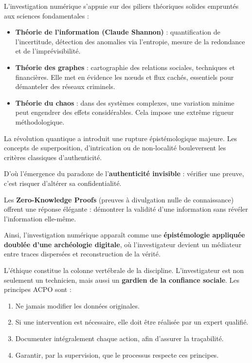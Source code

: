 \documentclass[12pt,a4paper]{report}
\begin{document}
{\noindent
L’investigation numérique s’appuie sur des piliers théoriques solides empruntés aux sciences fondamentales :  

\begin{itemize}
    \item \textbf{Théorie de l’information (Claude Shannon)} : quantification de l’incertitude, détection des anomalies via l’entropie, mesure de la redondance et de l’imprévisibilité.  

    \item \textbf{Théorie des graphes} : cartographie des relations sociales, techniques et financières. 
    Elle met en évidence les nœuds et flux cachés, essentiels pour démanteler des réseaux criminels.  

    \item \textbf{Théorie du chaos} : dans des systèmes complexes, une variation minime peut engendrer des effets considérables. 
    Cela impose une extrême rigueur méthodologique.  
\end{itemize}

La révolution quantique a introduit une rupture épistémologique majeure. 
Les concepts de superposition, d’intrication ou de non-localité bouleversent les critères classiques d’authenticité.  

\bigskip
D’où l’émergence du paradoxe de l’\textbf{authenticité invisible} : vérifier une preuve, c’est risquer d’altérer sa confidentialité.  

\medskip
Les \textbf{Zero-Knowledge Proofs} (preuves à divulgation nulle de connaissance) offrent une réponse élégante : démontrer la validité d’une information sans révéler l’information elle-même.  

Ainsi, l’investigation numérique apparaît comme une \textbf{épistémologie appliquée doublée d’une archéologie digitale}, où l’investigateur devient un médiateur entre traces dispersées et reconstruction de la vérité.

L’éthique constitue la colonne vertébrale de la discipline. 
L’investigateur est non seulement un technicien, mais aussi un \textbf{gardien de la confiance sociale}. {Les principes ACPO sont : }
\begin{enumerate}
    \item Ne jamais modifier les données originales.  
    \item Si une intervention est nécessaire, elle doit être réalisée par un expert qualifié.  
    \item Documenter intégralement chaque action, afin d’assurer la traçabilité.  
    \item Garantir, par la supervision, que le processus respecte ces principes.  
\end{enumerate}

}
\end{document}
